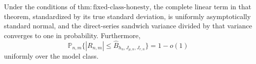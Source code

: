 Under the conditions of \(\mathrm{thm:fixed\text{-}class\text{-}honesty}\), the complete linear term in that theorem, standardized by its true standard deviation, is uniformly asymptotically standard normal, and the direct-series sandwich variance divided by that variance converges to one in probability.  Furthermore,
\[
\mathbb P_{n,m}\{|R_{n,m}|\le\widehat B_{h_n,J_{\mu,n},J_{r,n}}\}=1-o(1)
\]
uniformly over the model class.